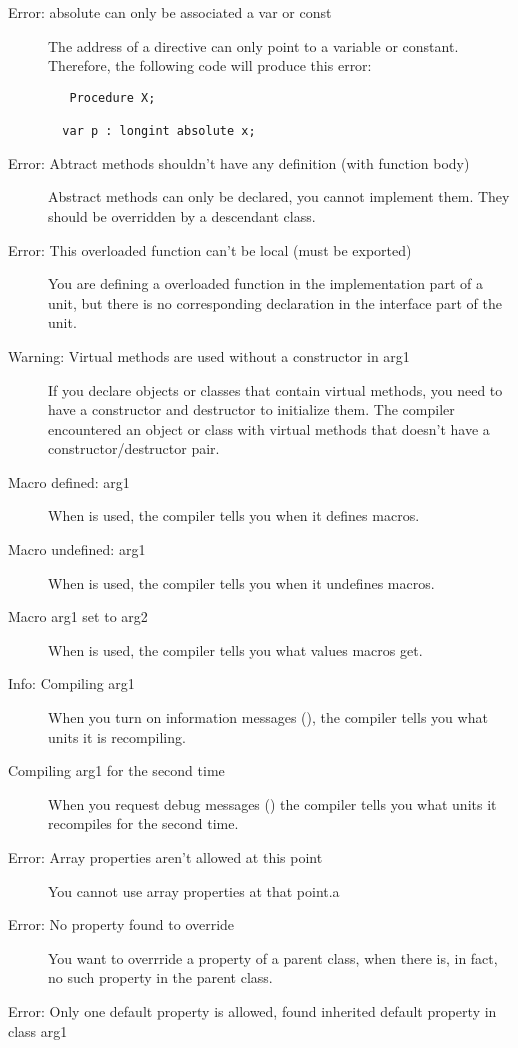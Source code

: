 \begin{description}
\item [Error: absolute can only be associated a var or const]
 The address of a  directive can only point to a variable or
 constant. Therefore, the following code will produce this error:
 \begin{verbatim}
   Procedure X;
 
  var p : longint absolute x;
 \end{verbatim}
 
\item [Error: Abtract methods shouldn't have any definition (with function body)]
 Abstract methods can only be declared, you cannot implement them. They
 should be overridden by a descendant class.
\item [Error: This overloaded function can't be local (must be exported)]
 You are defining a overloaded function in the implementation part of a unit,
 but there is no corresponding declaration in the interface part of the unit.
\item [Warning: Virtual methods are used without a constructor in arg1]
 If you declare objects or classes that contain virtual methods, you need
 to have a constructor and destructor to initialize them. The compiler
 encountered an object or class with virtual methods that doesn't have 
 a constructor/destructor pair.
\item [Macro defined: arg1]
 When  is used, the compiler tells you when it defines macros.
\item [Macro undefined: arg1]
 When  is used, the compiler tells you when it undefines macros.
\item [Macro arg1 set to arg2]
 When  is used, the compiler tells you what values macros get.
\item [Info: Compiling arg1]
 When you turn on information messages (), the compiler tells you 
 what units it is recompiling.
\item [Compiling arg1 for the second time]
 When you request debug messages () the compiler tells you what
 units it recompiles for the second time.
\item [Error: Array properties aren't allowed at this point]
 You cannot use  array properties at that point.a
\item [Error: No property found to override]
 You want to overrride a property of a parent class, when there is, in fact,
 no such property in the parent class.
\item [Error: Only one default property is allowed, found inherited default property in class arg1]

\end{description}
